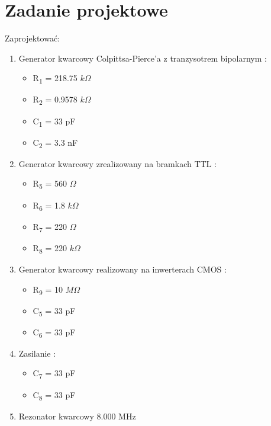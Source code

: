 \documentclass[a4paper,12pt]{article}
\begin{document}
\section{Zadanie projektowe}
Zaprojektować:
\begin{enumerate}
\item {Generator kwarcowy Colpittsa-Pierce'a z tranzysotrem bipolarnym :}
  \begin{itemize}
  \item R\textsubscript{1} = 218.75 $k\Omega$
  \item R\textsubscript{2} = 0.9578 $k\Omega$
  \item C\textsubscript{1} = 33 pF
  \item C\textsubscript{2} = 3.3 nF
  \end{itemize}
\item {Generator kwarcowy zrealizowany na bramkach TTL :}
  \begin{itemize}
  \item R\textsubscript{5} = 560 $\Omega$
  \item R\textsubscript{6} = 1.8 $k\Omega$
  \item R\textsubscript{7} = 220 $\Omega$
  \item R\textsubscript{8} = 220 $k\Omega$
  \end{itemize}
\item{Generator kwarcowy realizowany na inwerterach CMOS :}
  \begin{itemize}
  \item R\textsubscript{9} = 10 $M\Omega$
  \item C\textsubscript{5} = 33 pF
  \item C\textsubscript{6} = 33 pF
  \end{itemize}
\item{Zasilanie :}
  \begin{itemize}
  \item C\textsubscript{7} = 33 pF
  \item C\textsubscript{8} = 33 pF
  \end{itemize}
\item Rezonator kwarcowy 8.000 MHz
\end{enumerate}
\pagebreak
\end{document}
